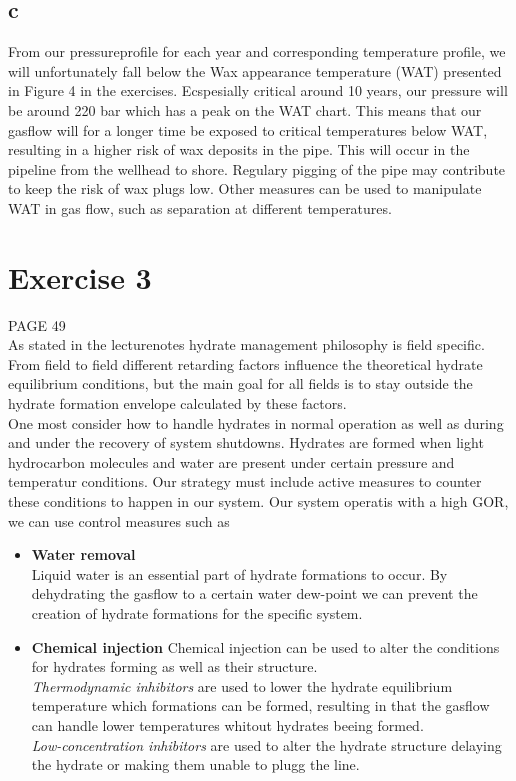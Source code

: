 \documentclass[a4paper,norsk]{article}
\begin{document}
\subsection*{c}
From our pressureprofile for each year and corresponding temperature profile, we will unfortunately fall below the
Wax appearance temperature (WAT) presented in Figure 4 in the exercises. Ecspesially critical around 10 years, our pressure will be around 220 bar which has a peak on the WAT chart. This means that our gasflow will for a longer time be exposed to critical temperatures below WAT, resulting in a higher risk of wax deposits in the pipe. This will occur in the pipeline from the wellhead to shore. Regulary pigging of the pipe may contribute to keep the risk of wax plugs low. Other measures can be used to manipulate WAT in gas flow, such as separation at different temperatures. 

\section*{Exercise 3}
PAGE 49 \\
As stated in the lecturenotes hydrate management philosophy is field specific. From field to field different retarding factors influence the theoretical hydrate equilibrium conditions, but the main goal for all fields is to stay outside the hydrate formation envelope calculated by these factors. \\
One most consider how to handle hydrates in normal operation as well as during and under the recovery of system shutdowns. Hydrates are formed when light hydrocarbon molecules and water are present under certain pressure and temperatur conditions. Our strategy must include active measures to counter these conditions to happen in our system.  
Our system operatis with a high GOR, we can use control measures such as 
\begin{itemize}
\item \textbf{Water removal} \\
Liquid water is an essential part of hydrate formations to occur. By dehydrating the gasflow to a certain water dew-point we can prevent the creation of hydrate formations for the specific system.

\item \textbf{Chemical injection}
Chemical injection can be used to alter the conditions for hydrates forming as well as their structure. \\
\textit{Thermodynamic inhibitors} are used to lower the hydrate equilibrium temperature which formations can be formed, resulting in that the gasflow can handle lower temperatures whitout hydrates beeing formed. \\
\textit{Low-concentration inhibitors} are used to alter the hydrate structure delaying the hydrate or making them unable to plugg the line.
\end{itemize}
\end{document}
